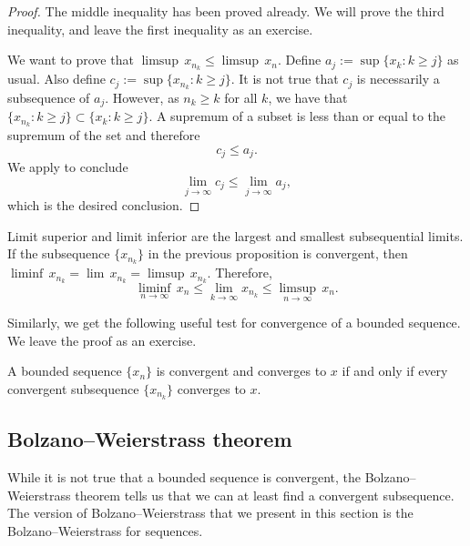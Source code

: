 \begin{proof}
The middle inequality has been proved already.  We will prove the third
inequality, and leave the first inequality as an exercise.

We want to prove that
$\limsup \, x_{n_k} \leq \limsup \, x_n$.  Define
$a_j := \sup \{ x_k : k \geq j \}$ 
as usual.
Also define
$c_j := \sup \{ x_{n_k} : k \geq j \}$.
It is not true that $c_j$ is necessarily a subsequence of $a_j$.  However,
as $n_k \geq k$ for all $k$, we have that
$\{ x_{n_k} : k \geq j \} \subset \{ x_k : k \geq j \}$.
A supremum of a subset is less than or equal to the supremum of the
set and therefore
\begin{equation*}
c_j \leq a_j .
\end{equation*}
We apply  to conclude 
\begin{equation*}
\lim_{j\to\infty} c_j \leq \lim_{j\to\infty} a_j ,
\end{equation*}
which is the desired conclusion.
\end{proof}

Limit superior and limit inferior
are the largest and smallest
subsequential limits.  If the subsequence $\{ x_{n_k} \}$ in the previous
proposition is convergent, then
$\liminf \, x_{n_k} = \lim\, x_{n_k} = \limsup \, x_{n_k}$.  Therefore,
\begin{equation*}
\liminf_{n\to\infty} \, x_n \leq
\lim_{k\to\infty} x_{n_k} \leq
\limsup_{n\to\infty} \, x_n .
\end{equation*}

Similarly, we get the following useful test for convergence
of a bounded sequence.  We leave the proof as an exercise.

\begin{prop} \label{seqconvsubseqconv:prop}
A bounded sequence $\{ x_n \}$ is convergent and converges to $x$
if and only if
every convergent subsequence
$\{ x_{n_k} \}$ converges to $x$.
\end{prop}

\subsection{Bolzano--Weierstrass theorem}

While it is not true that a bounded sequence is convergent, the
Bolzano--Weierstrass theorem tells us that we can at least find a convergent
subsequence.
The version of Bolzano--Weierstrass 
that we present in this section is the Bolzano--Weierstrass for
sequences.

